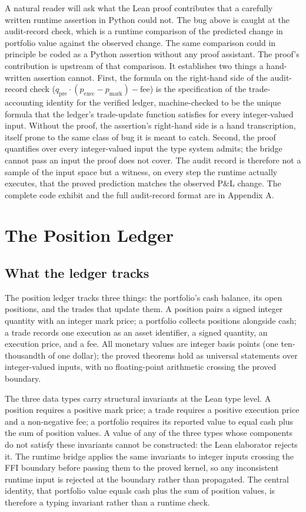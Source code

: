 \documentclass[
  11pt,
  letterpaper,
  DIV=12,
  numbers=noendperiod]{scrartcl}
\numberwithin{equation}{section}
\numberwithin{figure}{section}
\numberwithin{table}{section}
\let\quantproofsoldsection\section
\renewcommand{\section}{\clearpage\quantproofsoldsection}
\begin{document}
A natural reader will ask what the Lean proof contributes that a
carefully written runtime assertion in Python could not. The bug above
is caught at the audit-record check, which is a runtime comparison of
the predicted change in portfolio value against the observed change. The
same comparison could in principle be coded as a Python assertion
without any proof assistant. The proof's contribution is upstream of
that comparison. It establishes two things a hand-written assertion
cannot. First, the formula on the right-hand side of the audit-record
check (\(q_{\text{pre}} \cdot (p_{\text{exec}} - p_{\text{mark}}) -
\text{fee}\)) is the specification of the trade-accounting identity for
the verified ledger, machine-checked to be the unique formula that the
ledger's trade-update function satisfies for every integer-valued input.
Without the proof, the assertion's right-hand side is a hand
transcription, itself prone to the same class of bug it is meant to
catch. Second, the proof quantifies over every integer-valued input the
type system admits; the bridge cannot pass an input the proof does not
cover. The audit record is therefore not a sample of the input space but
a witness, on every step the runtime actually executes, that the proved
prediction matches the observed P\&L change. The complete code exhibit
and the full audit-record format are in Appendix A.

\section{The Position Ledger}\label{sec-ledger}

\subsection{What the ledger tracks}\label{sec-ledger-arch}

The position ledger tracks three things: the portfolio's cash balance,
its open positions, and the trades that update them. A position pairs a
signed integer quantity with an integer mark price; a portfolio collects
positions alongside cash; a trade records one execution as an asset
identifier, a signed quantity, an execution price, and a fee. All
monetary values are integer basis points (one ten-thousandth of one
dollar); the proved theorems hold as universal statements over
integer-valued inputs, with no floating-point arithmetic crossing the
proved boundary.

The three data types carry structural invariants at the Lean type level.
A position requires a positive mark price; a trade requires a positive
execution price and a non-negative fee; a portfolio requires its
reported value to equal cash plus the sum of position values. A value of
any of the three types whose components do not satisfy these invariants
cannot be constructed: the Lean elaborator rejects it. The runtime
bridge applies the same invariants to integer inputs crossing the FFI
boundary before passing them to the proved kernel, so any inconsistent
runtime input is rejected at the boundary rather than propagated. The
central identity, that portfolio value equals cash plus the sum of
position values, is therefore a typing invariant rather than a runtime
check.
\end{document}
